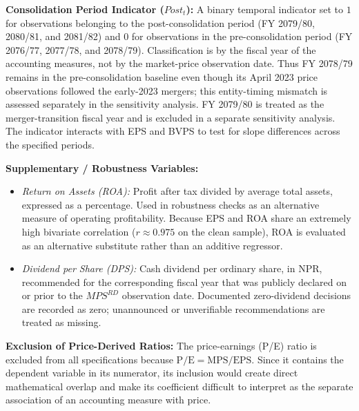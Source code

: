\textbf{Consolidation Period Indicator ($\mathit{Post}_t$):} A binary temporal
indicator set to $1$ for observations belonging to the post-consolidation period
(FY 2079/80, 2080/81, and 2081/82) and $0$ for observations in the
pre-consolidation period (FY 2076/77, 2077/78, and 2078/79). Classification is
by the fiscal year of the accounting measures, not by the market-price
observation date. Thus FY 2078/79 remains in the pre-consolidation baseline even
though its April 2023 price observations followed the early-2023 mergers; this
entity-timing mismatch is assessed separately in the sensitivity analysis. FY
2079/80 is treated as the merger-transition fiscal year and is excluded in a
separate sensitivity analysis. The indicator interacts with EPS and BVPS to
test for slope differences across the specified periods.

\textbf{Supplementary / Robustness Variables:}
\begin{itemize}
  \item \textit{Return on Assets (ROA):} Profit after tax divided by average total assets, expressed as a percentage. Used in robustness checks as an alternative measure of operating profitability. Because EPS and ROA share an extremely high bivariate correlation ($r \approx 0.975$ on the clean sample), ROA is evaluated as an alternative substitute rather than an additive regressor.
  \item \textit{Dividend per Share (DPS):} Cash dividend per ordinary share, in NPR, recommended for the corresponding fiscal year that was publicly declared on or prior to the $\mathit{MPS}^{RD}$ observation date. Documented zero-dividend decisions are recorded as zero; unannounced or unverifiable recommendations are treated as missing.
\end{itemize}

\textbf{Exclusion of Price-Derived Ratios:} The price-earnings (P/E) ratio is excluded from all specifications because $\text{P/E}=\text{MPS}/\text{EPS}$. Since it contains the dependent variable in its numerator, its inclusion would create direct mathematical overlap and make its coefficient difficult to interpret as the separate association of an accounting measure with price.

